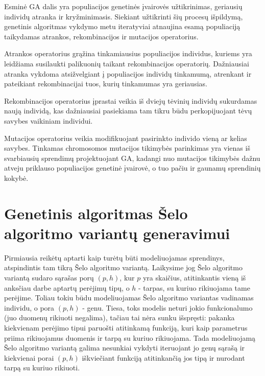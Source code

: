 \documentclass{VUMIFInfBakalaurinis}
\begin{document}
Esminė GA dalis yra populiacijos genetinės įvairovės užtikrinimas, geriausių individų atranka ir kryžminimasis.
Siekiant užtikrinti šių procesų išpildymą, genetinis algoritmas vykdymo metu
iteratyviai atnaujina esamą populiaciją taikydamas atrankos, rekombinacijos ir mutacijos operatorius.

Atrankos operatorius grąžina tinkamiausius populiacijos individus, kuriems yra leidžiama susilaukti palikuonių taikant rekombinacijos operatorių.
Dažniausiai atranka vykdoma atsižvelgiant į populiacijos individų tinkamumą, atrenkant ir pateikiant rekombinacijai tuos, kurių tinkamumas yra geriausias.

Rekombinacijos operatorius įprastai veikia iš dviejų tėvinių individų sukurdamas naują individą, kas dažniausiai pasiekiama
tam tikru būdu perkopijuojant tėvų savybes vaikiniam individui.

Mutacijos operatorius veikia modifikuojant pasirinkto individo vieną ar kelias savybes.
Tinkamas chromosomos mutacijos tikimybės parinkimas yra vienas iš svarbiausių sprendimų projektuojant GA,
kadangi nuo mutacijos tikimybės dažnu atveju priklauso populiacijos genetinė įvairovė, o tuo pačiu ir gaunamų sprendinių kokybė.

\section{Genetinis algoritmas Šelo algoritmo variantų generavimui}

Pirmiausia reikėtų aptarti kaip turėtų būti modeliuojamas sprendinys, atspindintis tam tikrą Šelo algoritmo variantą.
Laikysime jog Šelo algoritmo variantą sudaro sąrašas porų $(p, h)$, kur $p$ yra skaičius, atitinkantis vieną iš anksčiau darbe aptartų perėjimų tipų,
o $h$ - tarpas, su kuriuo rikiuojama tame perėjime.
Toliau tokiu būdu modeliuojamas Šelo algoritmo variantas vadinamas individu, o pora $(p, h)$ - genu.
Tiesa, toks modelis neturi jokio funkcionalumo (juo duomenų rikiuoti negalima), tačiau tai nėra sunku išspręsti: pakanka kiekvienam perėjimo tipui
paruošti atitinkamą funkciją, kuri kaip parametrus priima rikiuojamus duomenis ir tarpą su kuriuo rikiuojama.
Tada modeliuojamą Šelo algoritmo variantą galima nesunkiai vykdyti iteruojant jo genų sąrašą ir kiekvienai porai $(p, h)$ iškviečiant funkciją atitinkančią jos tipą ir nurodant tarpą su kuriuo rikiuoti.
\end{document}
